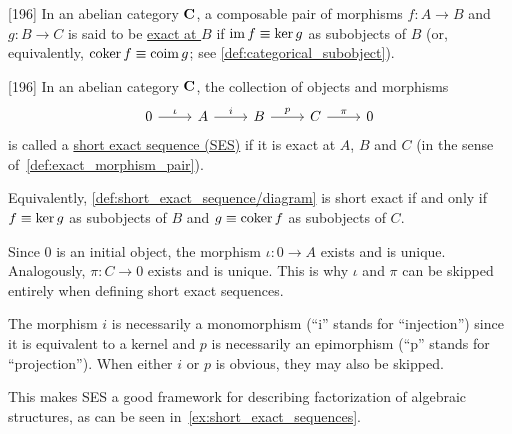 \begin{definition}\label{def:exact_morphism_pair}\cite{MacLane1994}[196]
  In an abelian category $\operatorname{\mathbf{C}}$, a composable pair of morphisms $f: A \to B$ and $g: B \to C$ is said to be \uline{exact at $B$} if $\operatorname{im} f \equiv \operatorname{ker} g$ as subobjects of $B$ (or, equivalently, $\operatorname{coker} f \equiv \operatorname{coim} g$; see \cref{def:categorical_subobject}).
\end{definition}

\begin{definition}\label{def:short_exact_sequence}\cite{MacLane1994}[196]
  In an abelian category $\operatorname{\mathbf{C}}$, the collection of objects and morphisms
  \begin{equation}\label{def:short_exact_sequence/diagram}
    \begin{tikzcd}[baseline=(current bounding box.center)]
      0 \arrow[r, "\iota"] & A \arrow[r, "i"] & B \arrow[r, "p"] & C \arrow[r, "\pi"] & 0
    \end{tikzcd}
  \end{equation}
  is called a \uline{short exact sequence (SES)} if it is exact at $A$, $B$ and $C$ (in the sense of~\cref{def:exact_morphism_pair}).

  Equivalently, \cref{def:short_exact_sequence/diagram} is short exact if and only if $f \equiv \operatorname{ker} g$ as subobjects of $B$ and $g \equiv \operatorname{coker} f$ as subobjects of $C$.
\end{definition}

\begin{note}\label{note:short_exact_sequence_factorization}
  Since $0$ is an initial object, the morphism $\iota: 0 \to A$ exists and is unique. Analogously, $\pi: C \to 0$ exists and is unique. This is why $\iota$ and $\pi$ can be skipped entirely when defining short exact sequences.

  The morphism $i$ is necessarily a monomorphism (\enquote{i} stands for \enquote{injection}) since it is equivalent to a kernel and $p$ is necessarily an epimorphism (\enquote{p} stands for \enquote{projection}). When either $i$ or $p$ is obvious, they may also be skipped.

  This makes SES a good framework for describing factorization of algebraic structures, as can be seen in~\cref{ex:short_exact_sequences}.
\end{note}

